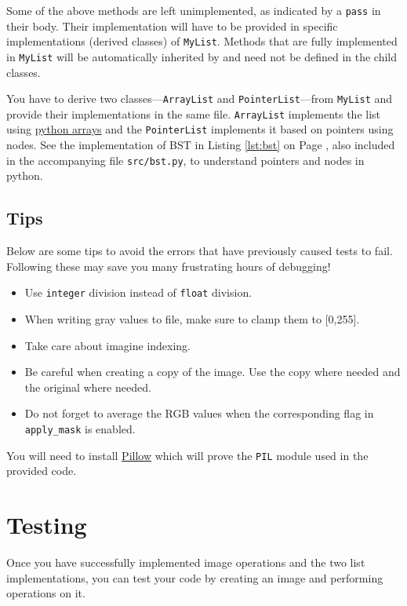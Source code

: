 \documentclass[addpoints]{exam}
\begin{document}
Some of the above methods are left unimplemented, as indicated by a \texttt{pass} in their body. Their implementation will have to be provided in specific implementations (derived classes) of \texttt{MyList}. Methods that are fully implemented in \texttt{MyList} will be automatically inherited by and need not be defined in the child classes.

You have to derive two classes---\texttt{ArrayList} and \texttt{PointerList}---from \texttt{MyList} and provide their implementations in the same file. \texttt{ArrayList} implements the list using \href{https://www.programiz.com/python-programming/array}{python arrays} and the \texttt{PointerList} implements it based on pointers using nodes. See the implementation of BST in Listing \ref{lst:bst} on Page \pageref{lst:bst}, also included in the accompanying file \texttt{src/bst.py}, to understand pointers and nodes in python. 


\subsection{Tips}

Below are some tips to avoid the errors that have previously caused tests to fail. Following these may save you many frustrating hours of debugging!
\begin{itemize}
\item Use \texttt{integer} division instead of \texttt{float} division.
\item When writing gray values to file, make sure to clamp them to [0,255].
\item Take care about imagine indexing.
\item Be careful when creating a copy of the image. Use the copy where needed and the original where needed.
\item Do not forget to average the RGB values when the corresponding flag in \texttt{apply\_mask} is enabled.
\end{itemize}

You will need to install \href{https://pillow.readthedocs.io/en/5.3.x/index.html}{Pillow} which will prove the \texttt{PIL} module used in the provided code.

\section{Testing}

Once you have successfully implemented image operations and the two list implementations, you can test your code by creating an image and performing operations on it. 
\end{document}
